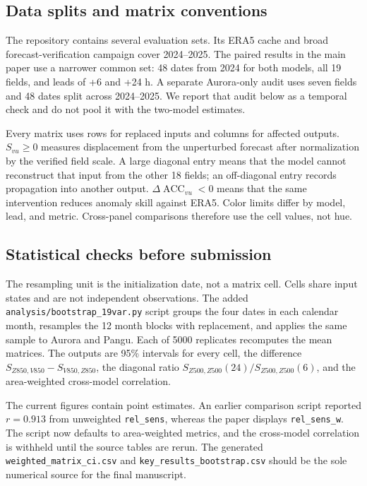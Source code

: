 \documentclass{article}
\newcommand{\acc}{\operatorname{ACC}}
\begin{document}
\subsection{Data splits and matrix conventions}
\label{app:provenance}

The repository contains several evaluation sets. Its ERA5 cache and broad forecast-verification campaign cover 2024--2025. The paired results in the main paper use a narrower common set: 48 dates from 2024 for both models, all 19 fields, and leads of +6 and +24 h. A separate Aurora-only audit uses seven fields and 48 dates split across 2024--2025. We report that audit below as a temporal check and do not pool it with the two-model estimates.

Every matrix uses rows for replaced inputs and columns for affected outputs. $S_{vu}\geq0$ measures displacement from the unperturbed forecast after normalization by the verified field scale. A large diagonal entry means that the model cannot reconstruct that input from the other 18 fields; an off-diagonal entry records propagation into another output. $\Delta\acc_{vu}<0$ means that the same intervention reduces anomaly skill against ERA5. Color limits differ by model, lead, and metric. Cross-panel comparisons therefore use the cell values, not hue.

\subsection{Statistical checks before submission}
\label{app:statistics}

The resampling unit is the initialization date, not a matrix cell. Cells share input states and are not independent observations. The added \texttt{analysis/bootstrap\_19var.py} script groups the four dates in each calendar month, resamples the 12 month blocks with replacement, and applies the same sample to Aurora and Pangu. Each of 5000 replicates recomputes the mean matrices. The outputs are 95\% intervals for every cell, the difference $S_{Z850,V850}-S_{V850,Z850}$, the diagonal ratio $S_{Z500,Z500}(24)/S_{Z500,Z500}(6)$, and the area-weighted cross-model correlation.

The current figures contain point estimates. An earlier comparison script reported $r=0.913$ from unweighted \texttt{rel\_sens}, whereas the paper displays \texttt{rel\_sens\_w}. The script now defaults to area-weighted metrics, and the cross-model correlation is withheld until the source tables are rerun. The generated \texttt{weighted\_matrix\_ci.csv} and \texttt{key\_results\_bootstrap.csv} should be the sole numerical source for the final manuscript.
\end{document}
